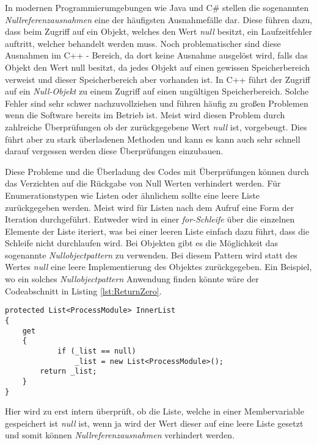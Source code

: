 \SuperPar In modernen Programmierumgebungen wie Java und C\# stellen die sogenannten \textit{Nullreferenzausnahmen} eine der häufigsten Ausnahmefälle dar. Diese führen dazu, dass beim Zugriff auf ein Objekt, welches den Wert \textit{null} besitzt, ein Laufzeitfehler auftritt, welcher behandelt werden muss. Noch problematischer sind diese Ausnahmen im C++ - Bereich, da dort keine Ausnahme ausgelöst wird, falls das Objekt den Wert null besitzt, da jedes Objekt auf einen gewissen Speicherbereich verweist und dieser Speicherbereich aber vorhanden ist. In C++ führt der Zugriff auf ein \textit{Null-Objekt} zu einem Zugriff auf einen ungültigen Speicherbereich. Solche Fehler sind sehr schwer nachzuvollziehen und führen häufig zu großen Problemen wenn die Software bereits im Betrieb ist. Meist wird diesen Problem durch zahlreiche Überprüfungen ob der zurückgegebene Wert \textit{null} ist, vorgebeugt. Dies führt aber zu stark überladenen Methoden und kann es kann auch sehr schnell darauf vergessen werden diese Überprüfungen einzubauen.

\SuperPar Diese Probleme und die Überladung des Codes mit Überprüfungen können durch das Verzichten auf die Rückgabe von Null Werten verhindert werden. Für Enumerationstypen wie Listen oder ähnlichem sollte eine leere Liste zurückgegeben werden. Meist wird für Listen nach dem Aufruf eine Form der Iteration durchgeführt. Entweder wird in einer \textit{for-Schleife} über die einzelnen Elemente der Liste iteriert, was bei einer leeren Liste einfach dazu führt, dass die Schleife nicht durchlaufen wird. Bei Objekten gibt es die Möglichkeit das sogenannte \textit{Nullobjectpattern} zu verwenden. Bei diesem Pattern wird statt des Wertes \textit{null} eine leere Implementierung des Objektes zurückgegeben. Ein Beispiel, wo ein solches \textit{Nullobjectpattern} Anwendung finden könnte wäre der Codeabschnitt in Listing \ref{lst:ReturnZero}. 

\begin{lstlisting}[language={[Sharp]C}, caption=Beispiele für Rückgabe eines Null Wertes, label=lst:ReturnZero]
protected List<ProcessModule> InnerList
{
	get
	{
			if (_list == null)
				_list = new List<ProcessModule>();
		return _list;
	}
}
\end{lstlisting}

\SuperPar Hier wird zu erst intern überprüft, ob die Liste, welche in einer Membervariable gespeichert ist \textit{null} ist, wenn ja wird der Wert dieser auf eine leere Liste gesetzt und somit können \textit{Nullreferenzausnahmen} verhindert werden. 


